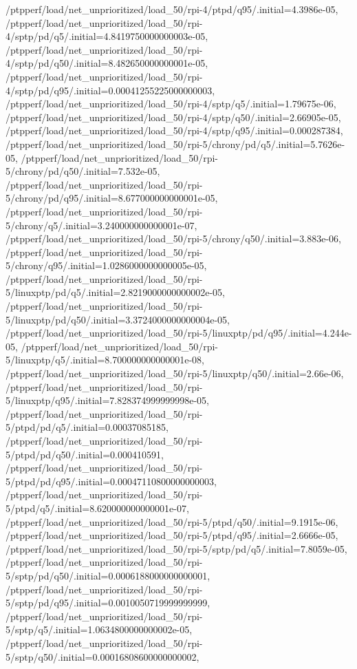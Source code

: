 {    /ptpperf/load/net_unprioritized/load_50/rpi-4/ptpd/q95/.initial=4.3986e-05,
    /ptpperf/load/net_unprioritized/load_50/rpi-4/sptp/pd/q5/.initial=4.8419750000000003e-05,
    /ptpperf/load/net_unprioritized/load_50/rpi-4/sptp/pd/q50/.initial=8.482650000000001e-05,
    /ptpperf/load/net_unprioritized/load_50/rpi-4/sptp/pd/q95/.initial=0.00041255225000000003,
    /ptpperf/load/net_unprioritized/load_50/rpi-4/sptp/q5/.initial=1.79675e-06,
    /ptpperf/load/net_unprioritized/load_50/rpi-4/sptp/q50/.initial=2.66905e-05,
    /ptpperf/load/net_unprioritized/load_50/rpi-4/sptp/q95/.initial=0.000287384,
    /ptpperf/load/net_unprioritized/load_50/rpi-5/chrony/pd/q5/.initial=5.7626e-05,
    /ptpperf/load/net_unprioritized/load_50/rpi-5/chrony/pd/q50/.initial=7.532e-05,
    /ptpperf/load/net_unprioritized/load_50/rpi-5/chrony/pd/q95/.initial=8.677000000000001e-05,
    /ptpperf/load/net_unprioritized/load_50/rpi-5/chrony/q5/.initial=3.240000000000001e-07,
    /ptpperf/load/net_unprioritized/load_50/rpi-5/chrony/q50/.initial=3.883e-06,
    /ptpperf/load/net_unprioritized/load_50/rpi-5/chrony/q95/.initial=1.0286000000000005e-05,
    /ptpperf/load/net_unprioritized/load_50/rpi-5/linuxptp/pd/q5/.initial=2.8219000000000002e-05,
    /ptpperf/load/net_unprioritized/load_50/rpi-5/linuxptp/pd/q50/.initial=3.3724000000000004e-05,
    /ptpperf/load/net_unprioritized/load_50/rpi-5/linuxptp/pd/q95/.initial=4.244e-05,
    /ptpperf/load/net_unprioritized/load_50/rpi-5/linuxptp/q5/.initial=8.700000000000001e-08,
    /ptpperf/load/net_unprioritized/load_50/rpi-5/linuxptp/q50/.initial=2.66e-06,
    /ptpperf/load/net_unprioritized/load_50/rpi-5/linuxptp/q95/.initial=7.828374999999998e-05,
    /ptpperf/load/net_unprioritized/load_50/rpi-5/ptpd/pd/q5/.initial=0.00037085185,
    /ptpperf/load/net_unprioritized/load_50/rpi-5/ptpd/pd/q50/.initial=0.000410591,
    /ptpperf/load/net_unprioritized/load_50/rpi-5/ptpd/pd/q95/.initial=0.00047110800000000003,
    /ptpperf/load/net_unprioritized/load_50/rpi-5/ptpd/q5/.initial=8.620000000000001e-07,
    /ptpperf/load/net_unprioritized/load_50/rpi-5/ptpd/q50/.initial=9.1915e-06,
    /ptpperf/load/net_unprioritized/load_50/rpi-5/ptpd/q95/.initial=2.6666e-05,
    /ptpperf/load/net_unprioritized/load_50/rpi-5/sptp/pd/q5/.initial=7.8059e-05,
    /ptpperf/load/net_unprioritized/load_50/rpi-5/sptp/pd/q50/.initial=0.0006188000000000001,
    /ptpperf/load/net_unprioritized/load_50/rpi-5/sptp/pd/q95/.initial=0.0010050719999999999,
    /ptpperf/load/net_unprioritized/load_50/rpi-5/sptp/q5/.initial=1.0634800000000002e-05,
    /ptpperf/load/net_unprioritized/load_50/rpi-5/sptp/q50/.initial=0.00016808600000000002,
}
